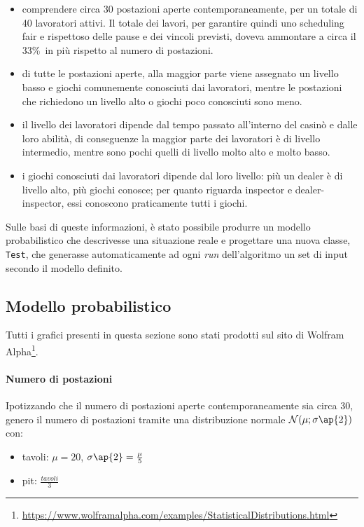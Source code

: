 \begin{itemize}
    \item comprendere circa 30 postazioni aperte contemporaneamente, per un totale di 40 lavoratori attivi. Il totale dei lavori, per garantire quindi uno scheduling fair e rispettoso delle pause e dei vincoli previsti, doveva ammontare a circa il 33\%\ in più rispetto al numero di postazioni.
    \item di tutte le postazioni aperte, alla maggior parte viene assegnato un livello basso e giochi comunemente conosciuti dai lavoratori, mentre le postazioni che richiedono un livello alto o giochi poco conosciuti sono meno.
    \item il livello dei lavoratori dipende dal tempo passato all'interno del casinò e dalle loro abilità, di conseguenze la maggior parte dei lavoratori è di livello intermedio, mentre sono pochi quelli di livello molto alto e molto basso.
    \item i giochi conosciuti dai lavoratori dipende dal loro livello: più un dealer è di livello alto, più giochi conosce; per quanto riguarda inspector e dealer-inspector, essi conoscono praticamente tutti i giochi.
\end{itemize}
Sulle basi di queste informazioni, è stato possibile produrre un modello probabilistico che descrivesse una situazione reale e progettare una nuova classe, \texttt{Test}, che generasse automaticamente ad ogni \textit{run} dell'algoritmo un set di input secondo il modello definito.

\subsection{Modello probabilistico}

Tutti i grafici presenti in questa sezione sono stati prodotti sul sito di Wolfram Alpha\footnote{{\color{blue} \url{https://www.wolframalpha.com/examples/StatisticalDistributions.html}}}.
    \paragraph{Numero di postazioni} Ipotizzando che il numero di postazioni aperte contemporaneamente sia circa 30, genero il numero di postazioni tramite una distribuzione normale $\mathcal{N}(\mu;\sigma \ap{2})$ con:
    \begin{itemize}
        \item tavoli: $\mu = 20$, $\sigma \ap{2} = \frac{\mu}{5}$
        \item pit: $\frac{tavoli}{3}$
    \end{itemize}

